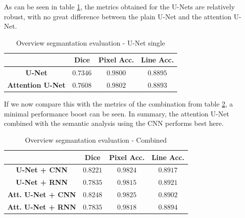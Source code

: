 \documentclass[conference]{IEEEtran}
\begin{document}
As can be seen in table \ref{results_unet}, the metrics obtained for the U-Nets are relatively robust, with no great difference between the plain U-Net and the attention U-Net. 
\begin{table}[htbp]
\caption{Overview segmantation evaluation - U-Net single}
\begin{center}
\begin{tabular}{|c|c|c|c|}
\hline
\textbf{} & Dice & Pixel Acc. & Line Acc. \\
\hline
\textbf{U-Net} & $0.7346$ & $0.9800$ & \boldmath$0.8895$ \\
\hline
\textbf{Attention U-Net} & \boldmath$0.7608$ & \boldmath$0.9802$ & $0.8893$ \\
\hline
\end{tabular}
\label{results_unet}
\end{center}
\end{table}
If we now compare this with the metrics of the combination from table \ref{results_combined}, a minimal performance boost can be seen. In summary, the attention U-Net combined with the semantic analysis using the CNN performs best here.
\begin{table}[htbp]
\caption{Overview segmantation evaluation - Combined}
\begin{center}
\begin{tabular}{|c|c|c|c|}
\hline
\textbf{} & Dice & Pixel Acc. & Line Acc. \\
\hline
\textbf{U-Net + CNN} & $0.8221$ & $0.9824$ & $0.8917$ \\
\hline
\textbf{U-Net + RNN} & $0.7835$ & $0.9815$ & \boldmath$0.8921$ \\
\hline
\textbf{Att. U-Net + CNN} & \boldmath$0.8248$ & \boldmath$0.9825$ & $0.8902$ \\
\hline
\textbf{Att. U-Net + RNN} & $0.7835$ & $0.9818$ & $0.8894$ \\
\hline
\end{tabular}
\label{results_combined}
\end{center}
\end{table}
\end{document}
